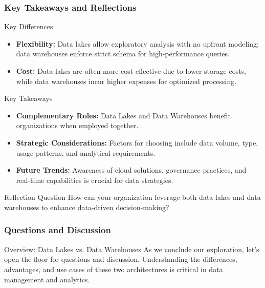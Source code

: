 \documentclass[aspectratio=169]{beamer}
\begin{document}
\begin{frame}[fragile]
    \frametitle{Key Takeaways and Reflections}
    
    \begin{block}{Key Differences}
        \begin{itemize}
            \item \textbf{Flexibility:} Data lakes allow exploratory analysis with no upfront modeling; data warehouses enforce strict schema for high-performance queries.
            \item \textbf{Cost:} Data lakes are often more cost-effective due to lower storage costs, while data warehouses incur higher expenses for optimized processing.
        \end{itemize}
    \end{block}

    \begin{block}{Key Takeaways}
        \begin{itemize}
            \item \textbf{Complementary Roles:} Data Lakes and Data Warehouses benefit organizations when employed together.
            \item \textbf{Strategic Considerations:} Factors for choosing include data volume, type, usage patterns, and analytical requirements.
            \item \textbf{Future Trends:} Awareness of cloud solutions, governance practices, and real-time capabilities is crucial for data strategies.
        \end{itemize}
    \end{block}

    \begin{block}{Reflection Question}
        How can your organization leverage both data lakes and data warehouses to enhance data-driven decision-making?
    \end{block}
\end{frame}

\begin{frame}[fragile]
    \frametitle{Questions and Discussion}
    \begin{block}{Overview: Data Lakes vs. Data Warehouses}
        As we conclude our exploration, let's open the floor for questions and discussion. Understanding the differences, advantages, and use cases of these two architectures is critical in data management and analytics.
    \end{block}
\end{frame}
\end{document}
